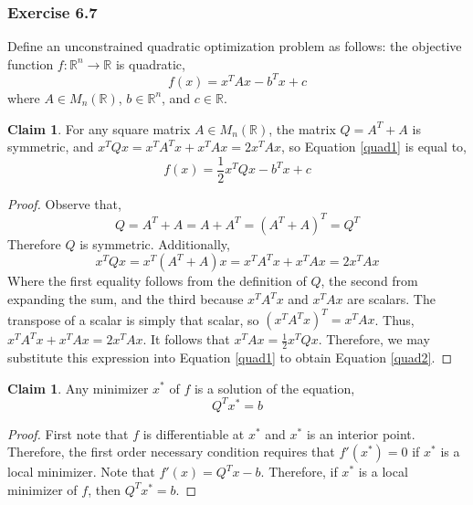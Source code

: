 \documentclass[letterpaper,12pt]{article}
\theoremstyle{definition}
\newtheorem{claim}[theorem]{Claim}
\begin{document}
\subsubsection*{Exercise 6.7} 
Define an unconstrained quadratic optimization problem as follows: the objective function $f: \mathbb{R}^n \to \mathbb{R}$ is quadratic,
\begin{equation}\label{quad1}
	f(x) = x^TAx - b^Tx + c
\end{equation}
where $A \in M_n(\mathbb{R})$, $b\in\mathbb{R}^n$, and $c \in \mathbb{R}$.
\begin{claim}
	For any square matrix $A \in M_n(\mathbb{R})$, the matrix $Q = A^T + A$ is symmetric, and $x^TQx = x^TA^Tx + x^TAx = 2x^TAx$, so Equation \ref{quad1} is equal to,
	\begin{equation}\label{quad2}
	f(x) = \frac{1}{2} x^TQx - b^Tx + c
	\end{equation}
\end{claim}
\begin{proof}
	Observe that,
\begin{equation}
	Q = A^T + A = A + A^T = (A^T + A)^T = Q^T
\end{equation}
	Therefore $Q$ is symmetric. Additionally,
	\begin{equation}
	x^TQx = x^T(A^T + A)x = x^TA^Tx + x^TAx = 2x^TAx
	\end{equation}
	Where the first equality follows from the definition of $Q$, the second from expanding the sum, and the third because $x^TA^Tx$ and $x^TAx$ are scalars. The transpose of a scalar is simply that scalar, so $(x^TA^Tx)^T = x^TAx$. Thus, $x^TA^Tx + x^TAx = 2x^TAx$. It follows that $x^TAx = \frac{1}{2} x^TQx$. Therefore, we may substitute this expression into Equation \ref{quad1} to obtain Equation \ref{quad2}.
\end{proof}

\begin{claim}
	Any minimizer $x^*$ of $f$ is a solution of the equation,
	\begin{equation}
		Q^T x^* = b
	\end{equation}
\end{claim}
\begin{proof}
	First note that $f$ is differentiable at $x^*$ and $x^*$ is an interior point. Therefore, the first order necessary condition requires that $f'(x^*) = 0$ if $x^*$ is a local minimizer. Note that $f'(x) = Q^T x - b$. Therefore, if $x^*$ is a local minimizer of $f$, then $Q^T x^* = b$. 
\end{proof}
\end{document}
